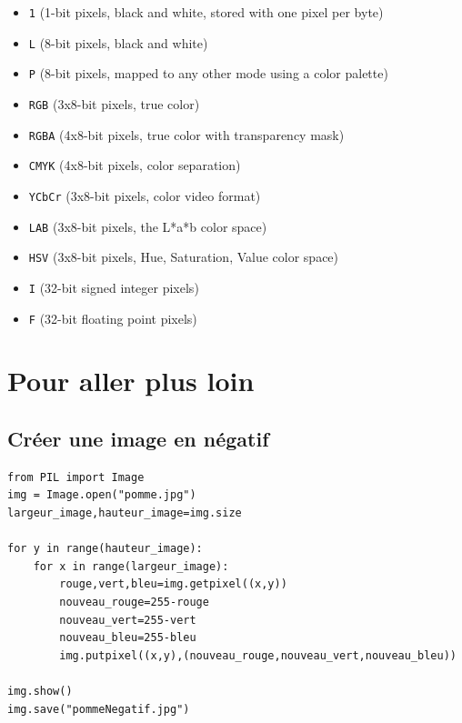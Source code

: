 \documentclass[11pt]{article}
\begin{document}
\begin{itemize}
\item \texttt{1} (1-bit pixels, black and white, stored with one pixel per byte)
\item \texttt{L} (8-bit pixels, black and white)
\item \texttt{P} (8-bit pixels, mapped to any other mode using a color palette)
\item \texttt{RGB} (3x8-bit pixels, true color)
\item \texttt{RGBA} (4x8-bit pixels, true color with transparency mask)
\item \texttt{CMYK} (4x8-bit pixels, color separation)
\item \texttt{YCbCr} (3x8-bit pixels, color video format)
\item \texttt{LAB} (3x8-bit pixels, the L*a*b color space)
\item \texttt{HSV} (3x8-bit pixels, Hue, Saturation, Value color space)
\item \texttt{I} (32-bit signed integer pixels)
\item \texttt{F} (32-bit floating point pixels)
\end{itemize}



\section{Pour aller plus loin}
\label{sec:org0d16e07}

\subsection{Créer une image en négatif}
\label{sec:org4daf353}

\begin{verbatim}
from PIL import Image
img = Image.open("pomme.jpg")
largeur_image,hauteur_image=img.size

for y in range(hauteur_image):
    for x in range(largeur_image):
        rouge,vert,bleu=img.getpixel((x,y))
        nouveau_rouge=255-rouge
        nouveau_vert=255-vert
        nouveau_bleu=255-bleu
        img.putpixel((x,y),(nouveau_rouge,nouveau_vert,nouveau_bleu))

img.show()
img.save("pommeNegatif.jpg")
\end{verbatim}
\end{document}
